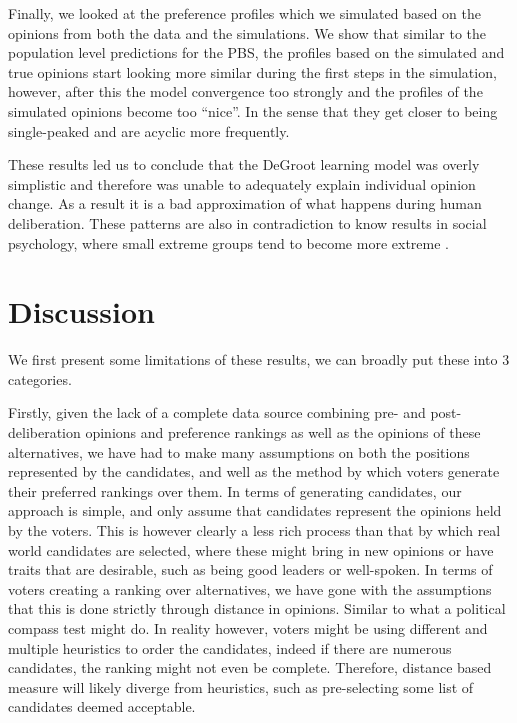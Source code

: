 Finally, we looked at the preference profiles which we simulated based on the
opinions from both the data and the simulations. We show that similar to the
population level predictions for the PBS, the profiles based on the simulated
and true opinions start looking more similar during the first steps in the
simulation, however, after this the model convergence too strongly and the profiles
of the simulated opinions become too ``nice''. In the sense that they get closer
to being single-peaked and are acyclic more frequently.

These results led us to conclude that the DeGroot learning model was overly
simplistic and therefore was unable to adequately explain individual opinion
change. As a result it is a bad approximation of what happens during human
deliberation. These patterns are also in contradiction to know results in
social psychology, where small extreme groups tend to become more extreme \cite{myersPolarizingEffectGroup1975}.

\section{Discussion}

We first present some limitations of these results, we can broadly put these into
3 categories.

Firstly, given the lack of a complete data source combining pre- and
post-deliberation opinions and preference rankings as well as the opinions of
these alternatives, we have had to make many assumptions on both the positions
represented by the candidates, and well as the method by which voters generate
their preferred rankings over them. In terms of generating candidates, our
approach is simple, and only assume that candidates represent the opinions held
by the voters. This is however clearly a less rich process than that by which
real world candidates are selected, where these might bring in new opinions or
have traits that are desirable, such as being good leaders or well-spoken. In
terms of voters creating a ranking over alternatives, we have gone with the
assumptions that this is done strictly through distance in opinions. Similar to
what a political compass test might do. In reality however, voters might be
using different and multiple heuristics to order the candidates, indeed if
there are numerous candidates, the ranking might not even be complete.
Therefore, distance based measure will likely diverge from heuristics, such as
pre-selecting some list of candidates deemed acceptable.


